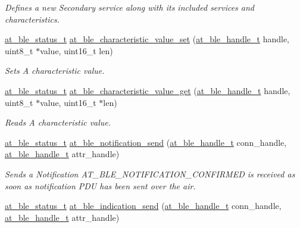 \begin{DoxyCompactItemize}
\begin{DoxyCompactList}\small\item\em Defines a new Secondary service along with its included services and characteristics. \end{DoxyCompactList}\item 
\mbox{\hyperlink{group__error__codes__group_ga3b1db9b95feb157b3c188ca27fe76988}{at\+\_\+ble\+\_\+status\+\_\+t}} \mbox{\hyperlink{group__gatt__server__group_ga505012ec9659b6c8a933611af55773b0}{at\+\_\+ble\+\_\+characteristic\+\_\+value\+\_\+set}} (\mbox{\hyperlink{at__ble__api_8h_abd23646d0c662860741f787efc8456f2}{at\+\_\+ble\+\_\+handle\+\_\+t}} handle, uint8\+\_\+t $\ast$value, uint16\+\_\+t len)
\begin{DoxyCompactList}\small\item\em Sets A characteristic value. \end{DoxyCompactList}\item 
\mbox{\hyperlink{group__error__codes__group_ga3b1db9b95feb157b3c188ca27fe76988}{at\+\_\+ble\+\_\+status\+\_\+t}} \mbox{\hyperlink{group__gatt__server__group_ga8397f87decb36953e937f04390c3ffa7}{at\+\_\+ble\+\_\+characteristic\+\_\+value\+\_\+get}} (\mbox{\hyperlink{at__ble__api_8h_abd23646d0c662860741f787efc8456f2}{at\+\_\+ble\+\_\+handle\+\_\+t}} handle, uint8\+\_\+t $\ast$value, uint16\+\_\+t $\ast$len)
\begin{DoxyCompactList}\small\item\em Reads A characteristic value. \end{DoxyCompactList}\item 
\mbox{\hyperlink{group__error__codes__group_ga3b1db9b95feb157b3c188ca27fe76988}{at\+\_\+ble\+\_\+status\+\_\+t}} \mbox{\hyperlink{group__gatt__server__group_ga5c380b2c2344c8812dbf14a23a4ac1dc}{at\+\_\+ble\+\_\+notification\+\_\+send}} (\mbox{\hyperlink{at__ble__api_8h_abd23646d0c662860741f787efc8456f2}{at\+\_\+ble\+\_\+handle\+\_\+t}} conn\+\_\+handle, \mbox{\hyperlink{at__ble__api_8h_abd23646d0c662860741f787efc8456f2}{at\+\_\+ble\+\_\+handle\+\_\+t}} attr\+\_\+handle)
\begin{DoxyCompactList}\small\item\em Sends a Notification A\+T\+\_\+\+B\+L\+E\+\_\+\+N\+O\+T\+I\+F\+I\+C\+A\+T\+I\+O\+N\+\_\+\+C\+O\+N\+F\+I\+R\+M\+ED is received as soon as notification P\+DU has been sent over the air. \end{DoxyCompactList}\item 
\mbox{\hyperlink{group__error__codes__group_ga3b1db9b95feb157b3c188ca27fe76988}{at\+\_\+ble\+\_\+status\+\_\+t}} \mbox{\hyperlink{group__gatt__server__group_ga53f16fb39e573e040d4b93571dfe97bb}{at\+\_\+ble\+\_\+indication\+\_\+send}} (\mbox{\hyperlink{at__ble__api_8h_abd23646d0c662860741f787efc8456f2}{at\+\_\+ble\+\_\+handle\+\_\+t}} conn\+\_\+handle, \mbox{\hyperlink{at__ble__api_8h_abd23646d0c662860741f787efc8456f2}{at\+\_\+ble\+\_\+handle\+\_\+t}} attr\+\_\+handle)

\end{DoxyCompactItemize}

